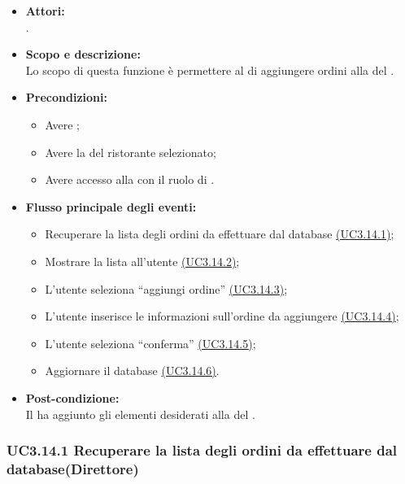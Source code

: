 \begin{itemize}
	\item \textbf{Attori:}
	\\.
	\item \textbf{Scopo e descrizione:} 
	\\Lo scopo di questa funzione è permettere al  di aggiungere ordini alla  del .
	\item \textbf{Precondizioni:}
	\begin{itemize}
		\item Avere ;
		\item Avere la  del ristorante selezionato;
		\item Avere accesso alla  con il ruolo di .
	\end{itemize}
	\item \textbf{Flusso principale degli eventi:}
	\begin{itemize}
		\item Recuperare la lista degli ordini da effettuare dal database \hyperref[UC3.14.1]{(UC3.14.1)};
		\item Mostrare la lista all'utente \hyperref[UC3.14.2]{(UC3.14.2)};
		\item L'utente  seleziona “aggiungi ordine” \hyperref[UC3.14.3]{(UC3.14.3)};
		\item L'utente  inserisce le informazioni sull'ordine da aggiungere \hyperref[UC3.14.4]{(UC3.14.4)};
		\item L'utente  seleziona “conferma” \hyperref[UC3.14.5]{(UC3.14.5)};
		\item Aggiornare il database \hyperref[UC3.14.6]{(UC3.14.6)}.
	\end{itemize}
	\item \textbf{Post-condizione:}
	\\Il {} ha aggiunto gli elementi desiderati alla  del .
\end{itemize}

\subsubsection{UC3.14.1 Recuperare la lista degli ordini da effettuare dal database(Direttore)} \label{UC3.14.1}

